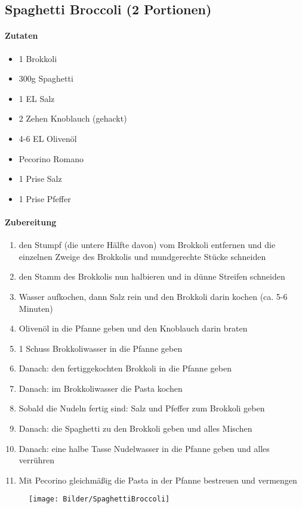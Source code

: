 \newpage
\subsection{Spaghetti Broccoli (2 Portionen)}
\paragraph{Zutaten}
\begin{itemize}[noitemsep]
	\item 1 Brokkoli
	\item 300g Spaghetti 
	\item 1 EL Salz
	\item 2 Zehen Knoblauch (gehackt)
	\item 4-6 EL Olivenöl
	\item Pecorino Romano
	\item 1 Prise Salz
	\item 1 Prise Pfeffer
\end{itemize}
\paragraph{Zubereitung}
\begin{enumerate}[noitemsep]
	\item den Stumpf (die untere Hälfte davon) vom Brokkoli entfernen und die einzelnen Zweige des Brokkolis und mundgerechte Stücke schneiden
	\item den Stamm des Brokkolis nun halbieren und in dünne Streifen schneiden
	\item Wasser aufkochen, dann Salz rein und den Brokkoli darin kochen (ca. 5-6 Minuten)
	\item Olivenöl in die Pfanne geben und den Knoblauch darin braten
	\item 1 Schuss Brokkoliwasser in die Pfanne geben 
	\item Danach: den fertiggekochten Brokkoli in die Pfanne geben 
	\item Danach: im Brokkoliwasser die Pasta kochen
	\item Sobald die Nudeln fertig sind: Salz und Pfeffer zum Brokkoli geben
	\item Danach: die Spaghetti zu den Brokkoli geben und alles Mischen
	\item Danach: eine halbe Tasse Nudelwasser in die Pfanne geben und alles verrühren
	\item Mit Pecorino gleichmäßig die Pasta in der Pfanne bestreuen und vermengen
\end{enumerate}
\begin{figure}[h]
\centering
\texttt{[image: Bilder/SpaghettiBroccoli]}
\end{figure}